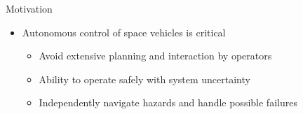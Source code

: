 \begin{frame}[t]{Motivation} %
\begin{itemize}
    \item Autonomous control of space vehicles is critical
    \begin{itemize}
        \item Avoid extensive planning and interaction by operators
        \item Ability to operate safely with system uncertainty 
        \item Independently navigate hazards and handle possible failures
    \end{itemize}
\end{itemize}
\end{frame}   %